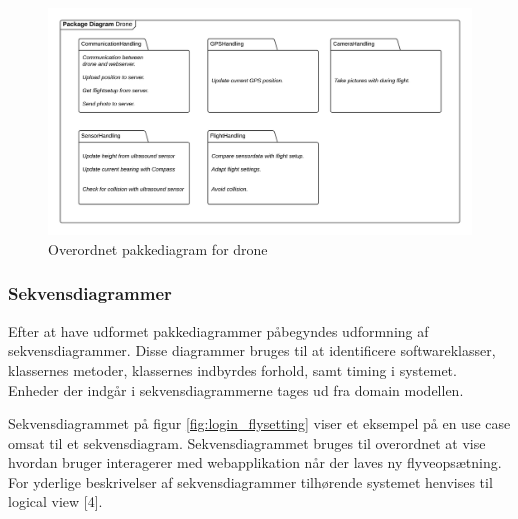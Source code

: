 \begin{figure}[H]
	\centering
	\includegraphics[width=1\textwidth]{Billeder/Projektbeskrivelse/Packagediagram_drone}
	\vspace{-0.9cm}	
	\caption{Overordnet pakkediagram for drone}
	\label{fig:package_drone}
\end{figure}

\newpage

\subsubsection*{Sekvensdiagrammer}
\vspace{-0.3cm}	

Efter at have udformet pakkediagrammer påbegyndes udformning af sekvensdiagrammer. Disse diagrammer bruges til at identificere softwareklasser, klassernes metoder, klassernes indbyrdes forhold, samt timing i systemet. Enheder der indgår i sekvensdiagrammerne tages ud fra domain modellen. 

Sekvensdiagrammet på figur \ref{fig:login_flysetting} viser et eksempel på en use case omsat til et sekvensdiagram. Sekvensdiagrammet bruges til overordnet at vise hvordan bruger interagerer med webapplikation når der laves ny flyveopsætning. For yderlige beskrivelser af sekvensdiagrammer tilhørende systemet henvises til logical view [4].

